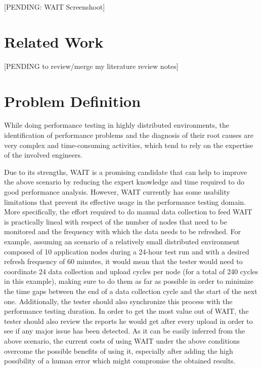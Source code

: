 \documentclass[runningheads,a4paper]{llncs}
\begin{document}
[PENDING: WAIT Screenshoot]


\section{Related Work}

[PENDING to review/merge my literature review notes]



\section{Problem Definition}

While doing performance testing in highly distributed environments, the
identification of performance problems and the diagnosis of their root causes are very complex and time-consuming
activities, which tend to rely on the expertise of the involved engineers.

Due to its strengths, WAIT is a promising candidate that can help to improve the
above scenario by reducing the expert knowledge and time required to do good
performance analysis. However, WAIT currently has some usability limitations
that prevent its effective usage in the performance testing domain. More
specifically, the effort required to do manual data collection to feed WAIT is
practically lineal with respect of the number of nodes that need to be monitored
and the frequency with which the data needs to be refreshed. For example,
assuming an scenario of a relatively small distributed environment composed
of 10 application nodes during a 24-hour test run and with a desired refresh
frequency of 60 minutes, it would mean that the tester would need to coordinate 
24 data collection and upload cycles per node (for a total of 240
cycles in this example), making sure to do them as far as possible in order to
minimize the time gaps between the end of a data collection cycle and the
start of the next one. Additionally, the tester should also synchronize this
process with the performance testing duration. In order to get the most value
out of WAIT, the tester should also review the reports he would get after every 
upload in order to see if any major issue has been detected. As it can be easily inferred from
the above scenario, the current costs of using WAIT under the above conditions
overcome the possible benefits of using it, especially after adding the high
possibility of a human error which might compromise the obtained results.
\end{document}
